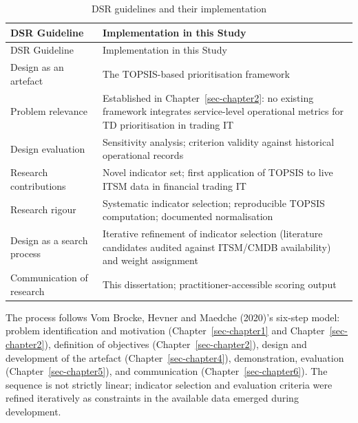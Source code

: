 \documentclass[
  12pt,
  letterpaper,
  12pt,
  oneside,
  english,
  onehalfspacing,
  headsepline]{MastersDoctoralThesis}
\begin{document}
\begin{longtable}[]{@{}
  >{\raggedright\arraybackslash}p{}
  >{\raggedright\arraybackslash}p{}@{}}
\caption{DSR guidelines and their
implementation}\label{tbl-dsr-guidelines}\tabularnewline
\toprule\noalign{}
\begin{minipage}[b]{\linewidth}\raggedright
DSR Guideline
\end{minipage} & \begin{minipage}[b]{\linewidth}\raggedright
Implementation in this Study
\end{minipage} \\
\midrule\noalign{}
\endfirsthead
\toprule\noalign{}
\begin{minipage}[b]{\linewidth}\raggedright
DSR Guideline
\end{minipage} & \begin{minipage}[b]{\linewidth}\raggedright
Implementation in this Study
\end{minipage} \\
\midrule\noalign{}
\endhead
\bottomrule\noalign{}
\endlastfoot
Design as an artefact & The TOPSIS-based prioritisation framework \\
Problem relevance & Established in Chapter~\ref{sec-chapter2}: no
existing framework integrates service-level operational metrics for TD
prioritisation in trading IT \\
Design evaluation & Sensitivity analysis; criterion validity against
historical operational records \\
Research contributions & Novel indicator set; first application of
TOPSIS to live ITSM data in financial trading IT \\
Research rigour & Systematic indicator selection; reproducible TOPSIS
computation; documented normalisation \\
Design as a search process & Iterative refinement of indicator selection
(literature candidates audited against ITSM/CMDB availability) and
weight assignment \\
Communication of research & This dissertation; practitioner-accessible
scoring output \\
\end{longtable}

The process follows Vom Brocke, Hevner and Maedche (2020)'s six-step
model: problem identification and motivation (Chapter~\ref{sec-chapter1}
and Chapter~\ref{sec-chapter2}), definition of objectives
(Chapter~\ref{sec-chapter2}), design and development of the artefact
(Chapter~\ref{sec-chapter4}), demonstration, evaluation
(Chapter~\ref{sec-chapter5}), and communication
(Chapter~\ref{sec-chapter6}). The sequence is not strictly linear;
indicator selection and evaluation criteria were refined iteratively as
constraints in the available data emerged during development.
\end{document}
